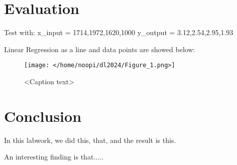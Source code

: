 \documentclass{article}
\begin{document}
\section{Evaluation}
Test with: 
x_input =  1714,1972,1620,1000
y_output = 3.12,2.54,2.95,1.93

Linear Regression as a line and data points are showed below:
\usepackage{graphicx}
\begin{figure}[h]
    \centering
    \texttt{[image: </home/noopi/dl2024/Figure\_1.png>]}
    \caption{<Caption text>}
    \label{<figure_label>}
\end{figure}
 

\section{Conclusion}

In this labwork, we did this, that, and the result is this.

An interesting finding is that.....
\end{document}
